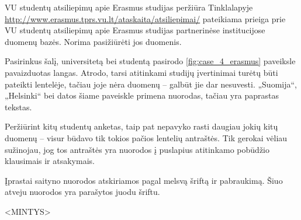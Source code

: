 \begin{xcase}{VU studentų atsiliepimų apie Erasmus studijas peržiūra}
  \xcgoal
  {
    Tinklalapyje \url{http://www.erasmus.tprs.vu.lt/ataskaita/atsiliepimai/}
    pateikiama prieiga prie VU studentų atsiliepimų apie Erasmus studijas
    partnerinėse institucijose duomenų bazės. Norima pasižiūrėti jos duomenis.
  }
  
  \xctools
  {
    Pasirinkus šalį, universitetą bei studentą pasirodo
    \ref{fig:case_4_erasmus} paveiksle pavaizduotas langas. Atrodo, tarsi
    atitinkami studijų įvertinimai turėtų būti pateikti lentelėje, tačiau
    joje nėra duomenų – galbūt jie dar nesuvesti. „Suomija“, „Helsinki“ bei
    datos šiame paveiskle primena nuorodas, tačiau yra paprastas tekstas.

  }
  
  \xcresult
  {
    Peržiūrint kitų studentų anketas, taip pat nepavyko rasti daugiau jokių
    kitų duomenų – visur būdavo tik tokios pačios lentelių antraštės. Tik
    gerokai vėliau sužinojau, jog tos antraštės yra nuorodos į puslapius
    atitinkamo pobūdžio klausimais ir atsakymais.
  }
  
  \xcprinciples
  {
    {
      Įprastai saityno nuorodos atskiriamos pagal melsvą šriftą ir
      pabraukimą. Šiuo atveju nuorodos yra parašytos juodu šriftu.
    }
  }
  
  \xcthoughts
  {
    <MINTYS>
  }
\end{xcase}
